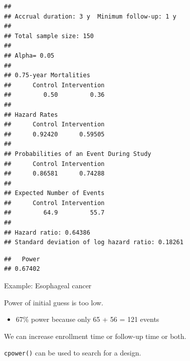 \documentclass[ignorenonframetext,]{beamer}
\providecommand{\tightlist}{%
  \setlength{\itemsep}{0pt}\setlength{\parskip}{0pt}}
\begin{document}
\begin{frame}[fragile]

\scriptsize

\begin{verbatim}
## 
## Accrual duration: 3 y  Minimum follow-up: 1 y
## 
## Total sample size: 150 
## 
## Alpha= 0.05 
## 
## 0.75-year Mortalities
##      Control Intervention 
##         0.50         0.36 
## 
## Hazard Rates
##      Control Intervention 
##      0.92420      0.59505 
## 
## Probabilities of an Event During Study
##      Control Intervention 
##      0.86581      0.74288 
## 
## Expected Number of Events
##      Control Intervention 
##         64.9         55.7 
## 
## Hazard ratio: 0.64386 
## Standard deviation of log hazard ratio: 0.18261
\end{verbatim}

\begin{verbatim}
##   Power 
## 0.67402
\end{verbatim}

\end{frame}

\begin{frame}{%
\protect\hypertarget{example-esophageal-cancer}{%
Example: Esophageal cancer}}

Power of initial guess is too low.

\begin{itemize}
\tightlist
\item
  67\% power because only 65 + 56 = 121 events
\end{itemize}

We can increase enrollment time or follow-up time or both.

\texttt{cpower()} can be used to search for a design.

\end{frame}
\end{document}
